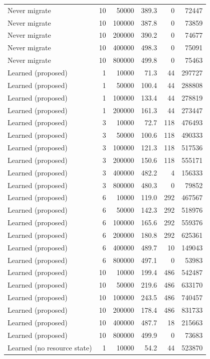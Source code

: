 \begin{table}[h]
\begin{tabular}{@{}lrrrrr@{}}
Never migrate & 10 & 50000 & 389.3 & 0 & 72447 \\
Never migrate & 10 & 100000 & 387.8 & 0 & 73859 \\
Never migrate & 10 & 200000 & 390.2 & 0 & 74677 \\
Never migrate & 10 & 400000 & 498.3 & 0 & 75091 \\
Never migrate & 10 & 800000 & 499.8 & 0 & 75463 \\
Learned (proposed) & 1 & 10000 & 71.3 & 44 & 297727 \\
Learned (proposed) & 1 & 50000 & 100.4 & 44 & 288808 \\
Learned (proposed) & 1 & 100000 & 133.4 & 44 & 278819 \\
Learned (proposed) & 1 & 200000 & 161.3 & 44 & 273447 \\
Learned (proposed) & 3 & 10000 & 72.7 & 118 & 476493 \\
Learned (proposed) & 3 & 50000 & 100.6 & 118 & 490333 \\
Learned (proposed) & 3 & 100000 & 121.3 & 118 & 517536 \\
Learned (proposed) & 3 & 200000 & 150.6 & 118 & 555171 \\
Learned (proposed) & 3 & 400000 & 482.2 & 4 & 156333 \\
Learned (proposed) & 3 & 800000 & 480.3 & 0 & 79852 \\
Learned (proposed) & 6 & 10000 & 119.0 & 292 & 467567 \\
Learned (proposed) & 6 & 50000 & 142.3 & 292 & 518976 \\
Learned (proposed) & 6 & 100000 & 165.6 & 292 & 559376 \\
Learned (proposed) & 6 & 200000 & 180.8 & 292 & 625361 \\
Learned (proposed) & 6 & 400000 & 489.7 & 10 & 149043 \\
Learned (proposed) & 6 & 800000 & 497.1 & 0 & 53983 \\
Learned (proposed) & 10 & 10000 & 199.4 & 486 & 542487 \\
Learned (proposed) & 10 & 50000 & 219.6 & 486 & 633170 \\
Learned (proposed) & 10 & 100000 & 243.5 & 486 & 740457 \\
Learned (proposed) & 10 & 200000 & 178.4 & 486 & 831733 \\
Learned (proposed) & 10 & 400000 & 487.7 & 18 & 215663 \\
Learned (proposed) & 10 & 800000 & 499.9 & 0 & 73683 \\
Learned (no resource state) & 1 & 10000 & 54.2 & 44 & 523870 \\

\end{tabular}
\end{table}
